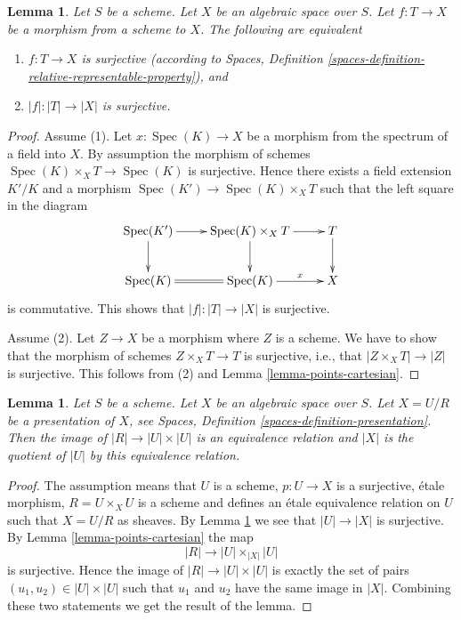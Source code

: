 \documentclass{stacks-project}
\theoremstyle{plain}
\newtheorem{lemma}[subsection]{Lemma}
\theoremstyle{definition}
\theoremstyle{remark}
\numberwithin{equation}{subsection}
\def\Spec{\mathop{\mathrm{Spec}}}
\begin{document}
\begin{lemma}
\label{lemma-characterize-surjective}
Let $S$ be a scheme.
Let $X$ be an algebraic space over $S$.
Let $f : T \to X$ be a morphism from a scheme to $X$.
The following are equivalent
\begin{enumerate}
\item $f : T \to X$ is surjective (according to
Spaces, Definition \ref{spaces-definition-relative-representable-property}),
and
\item $|f| : |T| \to |X|$ is surjective.
\end{enumerate}
\end{lemma}

\begin{proof}
Assume (1). Let $x : \Spec(K) \to X$ be a morphism
from the spectrum of a field into $X$. By assumption the morphism of
schemes $\Spec(K) \times_X T \to \Spec(K)$ is surjective.
Hence there exists a field extension $K'/K$ and a morphism
$\Spec(K') \to \Spec(K) \times_X T$ such that the left
square in the diagram
$$
\xymatrix{
\Spec(K') \ar[r] \ar[d] &
\Spec(K) \times_X T \ar[d] \ar[r] &
T \ar[d] \\
\Spec(K) \ar@{=}[r] &
\Spec(K) \ar[r]^-x & X
}
$$
is commutative. This shows that $|f| : |T| \to |X|$ is surjective.

\medskip\noindent
Assume (2). Let $Z \to X$ be a morphism where $Z$ is
a scheme. We have to show that the morphism of schemes $Z \times_X T \to T$
is surjective, i.e., that $|Z \times_X T| \to |Z|$ is surjective.
This follows from (2) and
Lemma \ref{lemma-points-cartesian}.
\end{proof}

\begin{lemma}
\label{lemma-points-presentation}
Let $S$ be a scheme.
Let $X$ be an algebraic space over $S$.
Let $X = U/R$ be a presentation of $X$, see
Spaces, Definition \ref{spaces-definition-presentation}.
Then the image of $|R| \to |U| \times |U|$ is an equivalence relation
and $|X|$ is the quotient of $|U|$ by this equivalence relation.
\end{lemma}

\begin{proof}
The assumption means that $U$ is a scheme, $p : U \to X$ is a surjective,
\'etale morphism, $R = U \times_X U$ is a scheme and defines an \'etale
equivalence relation on $U$ such that $X = U/R$ as sheaves. By
Lemma \ref{lemma-characterize-surjective}
we see that $|U| \to |X|$ is surjective. By
Lemma \ref{lemma-points-cartesian}
the map
$$
|R| \longrightarrow |U| \times_{|X|} |U|
$$
is surjective. Hence the image of $|R| \to |U| \times |U|$ is
exactly the set of pairs $(u_1, u_2) \in |U| \times |U|$
such that $u_1$ and $u_2$ have the same image in $|X|$.
Combining these two statements we get the result of the lemma.
\end{proof}
\end{document}
